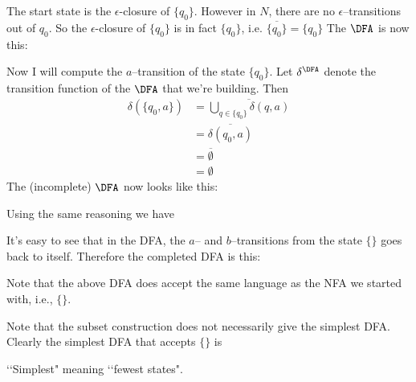 

The start state is the $\epsilon$-closure of $\{q_0\}$.
However in $N$, there are no $\epsilon$--transitions out of 
$q_0$.
So the $\epsilon$-closure of $\{q_0\}$ is in fact $\{q_0\}$, i.e.
$\overline{\{q_0\}} = \{q_0\}$
The $\DFA$ is now this:



Now I will compute the $a$--transition of the state $\{q_0\}$.
Let $\delta^\DFA$ denote the transition function of the $\DFA$
that we're building.
Then
\begin{align*}
\delta( \{q_0, a\} ) 
&= \overline{ \bigcup_{q \in \{q_0\}} \delta(q, a)} \\
&= \overline{ \delta(q_0, a) } \\
&= \overline{ \emptyset } \\
&= \emptyset
\end{align*}
The (incomplete) $\DFA$ now looks like this:



Using the same reasoning we have



It's easy to see that in the DFA, the $a$--
and $b$--transitions from the state $\{\}$ goes back to itself.
Therefore the completed DFA is this:



Note that the above DFA does accept the same language as the 
NFA we started with, i.e., $\{\}$.

Note that the subset construction does not
necessarily give the simplest DFA.
Clearly the simplest DFA that accepts $\{\}$ is

\lq\lq Simplest" meaning \lq\lq fewest states".


\vspace{3in}






